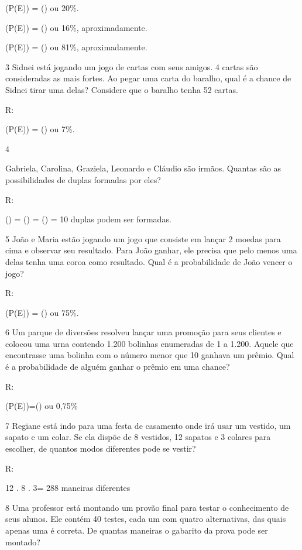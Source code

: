 {(P(E)) = () ou 20\%.
\item

(P(E)) = () ou 16\%, aproximadamente.
\item

(P(E)) = () ou 81\%,
aproximadamente.

\num{3} Sidnei está jogando um jogo de cartas com seus amigos. 4 cartas são
consideradas as mais fortes. Ao pegar uma carta do baralho, qual é a
chance de Sidnei tirar uma delas? Considere que o baralho tenha 52
cartas.

R:

(P(E)) = () ou 7\%.

\num{4}

Gabriela, Carolina, Graziela, Leonardo e Cláudio são irmãos. Quantas são
as possibilidades de duplas formadas por eles?

R:

() = () = () = 10
duplas podem ser formadas.

\num{5} João e Maria estão jogando um jogo que consiste em lançar 2 moedas
para cima e observar seu resultado. Para João ganhar, ele precisa que
pelo menos uma delas tenha uma coroa como resultado. Qual é a
probabilidade de João vencer o jogo?

R:

(P(E)) = () ou 75\%.

\num{6} Um parque de diversões resolveu lançar uma promoção para seus
clientes e colocou uma urna contendo 1.200 bolinhas enumeradas de 1 a
1.200. Aquele que encontrasse uma bolinha com o número menor que 10
ganhava um prêmio. Qual é a probabilidade de alguém ganhar o prêmio em
uma chance?

R:

(P(E))=() ou 0,75\%

\num{7} Regiane está indo para uma festa de casamento onde irá usar um
vestido, um sapato e um colar. Se ela dispõe de 8 vestidos, 12 sapatos e
3 colares para escolher, de quantos modos diferentes pode se vestir?

R:

12 . 8 . 3= 288 maneiras diferentes

\num{8} Uma professor está montando um provão final para testar o
conhecimento de seus alunos. Ele contém 40 testes, cada um com quatro
alternativas, das quais apenas uma é correta. De quantas maneiras o
gabarito da prova pode ser montado?

}

